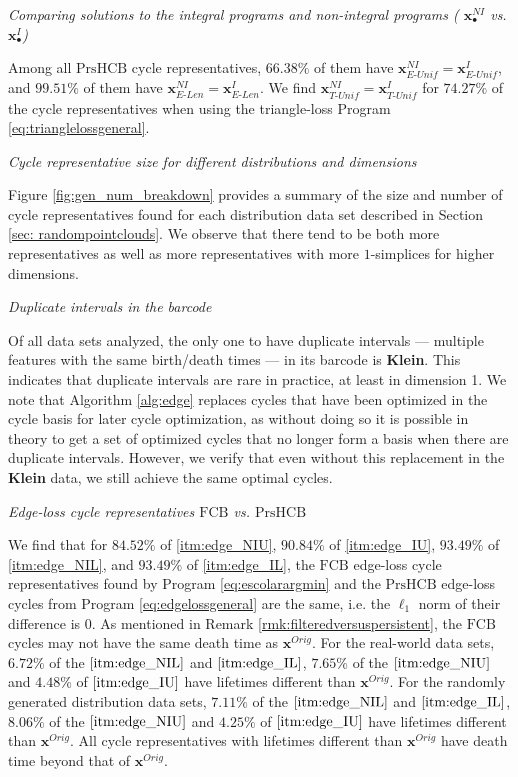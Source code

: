 \documentclass[utf8]{formatting_stuff/frontiersFPHY}
\newcommand{\originalrep}{\mathbf{x}^{Orig}}
\newcommand{\optimalrep}{\mathbf{x}}
\newcommand{\fig}{Figure }
\newcommand{\setoffilteredcyclebases}{\mathrm{FCB}}
\newcommand{\setofpersistenthcyclebases}{\mathrm{PrsHCB}}
\newcommand{\pr}{Program }
\newcommand{\EU}{_{E\text{-}Unif}}
\newcommand{\EL}{_{E\text{-}Len}}
\newcommand{\TU}{_{T\text{-}Unif}}
\theoremstyle{plain}
\theoremstyle{definition}
\begin{document}
\noindent \emph{Comparing solutions to the integral programs and non-integral programs ( $\optimalrep^{NI}_\bullet$ vs. $\optimalrep^{I}_{\bullet}$)}

Among all $\setofpersistenthcyclebases$ cycle representatives, $66.38\%$ of them have $\optimalrep^{NI}\EU = \optimalrep^{I}\EU$, and  $99.51\%$ of them have $\optimalrep^{NI}\EL = \optimalrep^{I}\EL$. We find $\optimalrep^{NI}\TU = \optimalrep^{I}\TU$ for $74.27\%$ of the cycle representatives when using the triangle-loss \pr \eqref{eq:trianglelossgeneral}. 


\noindent \emph{Cycle representative size for different distributions and dimensions}

\fig \ref{fig:gen_num_breakdown} provides a summary of the size and number of cycle representatives found for each distribution data set described in Section \ref{sec: randompointclouds}. We observe that there tend to be both more representatives as well as more representatives with more $1$-simplices for higher dimensions.

\noindent \emph{Duplicate intervals in the barcode}

Of all data sets analyzed, the only one to have duplicate intervals --- multiple features with the same birth/death times --- in its barcode is \textbf{Klein}. This indicates that duplicate intervals are rare in practice, at least in dimension 1. We note that Algorithm \ref{alg:edge} replaces cycles that have been optimized in the cycle basis for later cycle optimization, as without doing so it is possible in theory to get a set of optimized cycles that no longer form a basis when there are duplicate intervals. However, we verify that even without this replacement in the \textbf{Klein} data, we still achieve the same optimal cycles. 

 \noindent \emph{Edge-loss cycle representatives $\setoffilteredcyclebases$ vs. $\setofpersistenthcyclebases$}

We find that for $84.52\%$ of \ref{itm:edge_NIU}, $90.84\%$ of \ref{itm:edge_IU}, $93.49\%$ of \ref{itm:edge_NIL}, and $93.49\%$ of \ref{itm:edge_IL}, the $\setoffilteredcyclebases$ edge-loss cycle representatives found by \pr \eqref{eq:escolarargmin} and the $\setofpersistenthcyclebases$ edge-loss cycles from \pr \eqref{eq:edgelossgeneral} are the same, i.e. the $\ell_1$ norm of their difference is $0$. As mentioned in Remark \ref{rmk:filteredversuspersistent}, the $\setoffilteredcyclebases$ cycles may not have the same death time as $\originalrep$. For the real-world data sets, $6.72\%$ of the $\eqref{itm:edge_NIL}$ and $\eqref{itm:edge_IL}$,  $7.65\%$ of the $\eqref{itm:edge_NIU}$ and $4.48\%$ of $\eqref{itm:edge_IU}$ have lifetimes different than $\originalrep$. For the randomly generated distribution data sets, $7.11\%$ of the $\eqref{itm:edge_NIL}$ and $\eqref{itm:edge_IL}$,  $8.06\%$ of the $\eqref{itm:edge_NIU}$ and $4.25\%$ of $\eqref{itm:edge_IU}$ have lifetimes different than $\originalrep$. All cycle representatives with lifetimes different than $\originalrep$ have death time beyond that of $\originalrep$.
\end{document}
